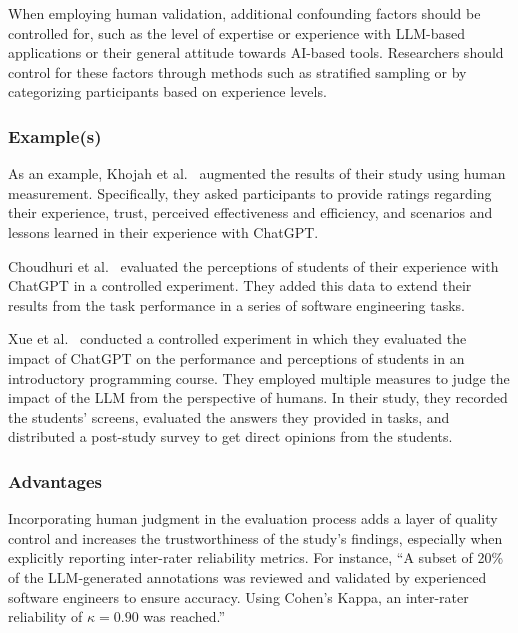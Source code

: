 When employing human validation, additional confounding factors should be controlled for, such as the level of expertise or experience with LLM-based applications or their general attitude towards AI-based tools.
Researchers should control for these factors through methods such as stratified sampling or by categorizing participants based on experience levels.


\subsubsection{Example(s)}

As an example, Khojah et al.~\cite{DBLP:journals/pacmse/KhojahM0N24} augmented the results of their study using human measurement.
Specifically, they asked participants to provide ratings regarding their experience, trust, perceived effectiveness and efficiency, and scenarios and lessons learned in their experience with ChatGPT.

Choudhuri et al.~\cite{DBLP:conf/icse/ChoudhuriLSGS24} evaluated the perceptions of students of their experience with ChatGPT in a controlled experiment.
They added this data to extend their results from the task performance in a series of software engineering tasks.

Xue et al.~\cite{DBLP:conf/icse/XueCBTH24} conducted a controlled experiment in which they evaluated the impact of ChatGPT on the performance and perceptions of students in an introductory programming course.
They employed multiple measures to judge the impact of the LLM from the perspective of humans.
In their study, they recorded the students' screens, evaluated the answers they provided in tasks, and distributed a post-study survey to get direct opinions from the students.


\subsubsection{Advantages}

Incorporating human judgment in the evaluation process adds a layer of quality control and increases the trustworthiness of the study’s findings, especially when explicitly reporting inter-rater reliability metrics. For instance, ``A subset of 20\% of the LLM-generated annotations was reviewed and validated by experienced software engineers to ensure accuracy. Using Cohen's Kappa, an inter-rater reliability of $\kappa = 0.90$ was reached.''

